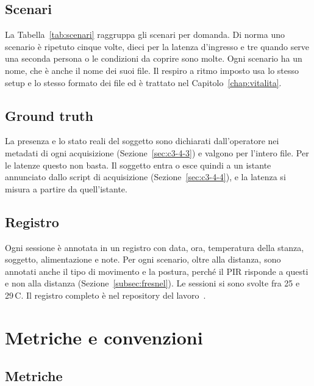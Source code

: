 \subsection{Scenari}
\label{sec:protocollo-scenari}

La Tabella~\ref{tab:scenari} raggruppa gli scenari per domanda. Di norma uno scenario è ripetuto
cinque volte, dieci per la latenza d'ingresso e tre quando serve una seconda persona o le
condizioni da coprire sono molte. Ogni scenario ha un nome, che è anche il nome dei suoi
file. Il respiro a ritmo imposto usa lo stesso setup e lo stesso formato dei file ed è trattato
nel Capitolo~\ref{chap:vitalita}.

\subsection{Ground truth}
\label{sec:protocollo-ripetizioni}
\label{sec:protocollo-groundtruth}

La presenza e lo stato reali del soggetto sono dichiarati dall'operatore nei metadati di
ogni acquisizione (Sezione~\ref{sec:c3-4-3}) e valgono per l'intero file. Per le latenze
questo non basta. Il soggetto entra o esce quindi a un istante annunciato dallo script di
acquisizione (Sezione~\ref{sec:c3-4-4}), e la latenza si misura a partire da
quell'istante.

\subsection{Registro}
\label{sec:registro}

Ogni sessione è annotata in un registro con data, ora, temperatura della stanza,
soggetto, alimentazione e note. Per ogni scenario, oltre alla distanza, sono annotati
anche il tipo di movimento e la postura, perché il PIR risponde a questi e non alla
distanza (Sezione~\ref{subsec:fresnel}). Le sessioni si sono svolte fra 25 e 29\,\textdegree C. Il registro
completo è nel repository del lavoro~\cite{repoTesi}.

\section{Metriche e convenzioni}
\label{sec:metriche}

\subsection{Metriche}
\label{sec:metriche-elenco}

